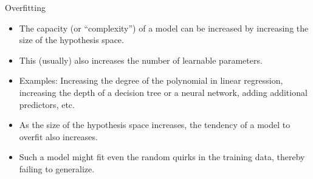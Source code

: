 \documentclass[11pt,compress,t,notes=noshow, xcolor=table]{beamer}
\begin{document}
\begin{vbframe} {Overfitting}
  \begin{itemize}
    \item The capacity (or \enquote{complexity}) of a model can be increased by increasing the size of the hypothesis space. 
    \item This (usually) also increases the number of learnable parameters. 
    \item Examples: Increasing the degree of the polynomial in linear regression, increasing the depth of a decision tree or a neural network, adding additional predictors, etc.  
    
  
  \item As the size of the hypothesis space increases, the tendency of a model to overfit also increases.
  \item Such a model might fit even the random quirks in the training data, thereby failing to generalize.

  \end{itemize} 
\end{vbframe}
\end{document}
